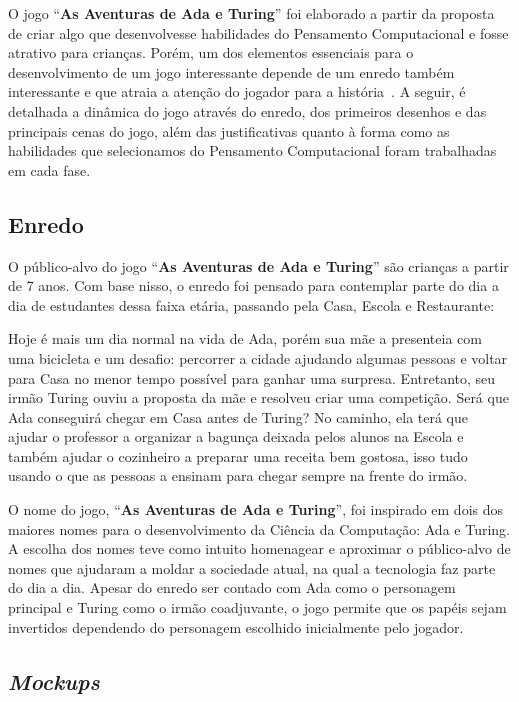 O jogo “\textbf{As Aventuras de Ada e Turing}” foi elaborado a partir da proposta de criar algo que desenvolvesse habilidades do Pensamento Computacional e fosse atrativo para crianças. Porém, um dos elementos essenciais para o desenvolvimento de um jogo interessante depende de um enredo também interessante e que atraia a atenção do jogador para a história~\cite{arruda2014fundamentos}. A seguir, é detalhada a dinâmica do jogo através do enredo, dos primeiros desenhos e das principais cenas do jogo, além das justificativas quanto à forma como as habilidades que selecionamos do Pensamento Computacional foram trabalhadas em cada fase.

\subsection{Enredo} \label{ssec:enredo}

O público-alvo do jogo “\textbf{As Aventuras de Ada e Turing}” são crianças a partir de 7 anos. Com base nisso, o enredo foi pensado para contemplar parte do dia a dia de estudantes dessa faixa etária, passando pela Casa, Escola e Restaurante:

Hoje é mais um dia normal na vida de Ada, porém sua mãe a presenteia com uma bicicleta e um desafio: percorrer a cidade ajudando algumas pessoas e voltar para Casa no menor tempo possível para ganhar uma surpresa. Entretanto, seu irmão Turing ouviu a proposta da mãe e resolveu criar uma competição. Será que Ada conseguirá chegar em Casa antes de Turing? No caminho, ela terá que ajudar o professor a organizar a bagunça deixada pelos alunos na Escola e também ajudar o cozinheiro a preparar uma receita bem gostosa, isso tudo usando o que as pessoas a ensinam para chegar sempre na frente do irmão.

O nome do jogo, “\textbf{As Aventuras de Ada e Turing}”, foi inspirado em dois dos maiores nomes para o desenvolvimento da Ciência da Computação: Ada e Turing. A escolha dos nomes teve como intuito homenagear e aproximar o público-alvo de nomes que ajudaram a moldar a sociedade atual, na qual a tecnologia faz parte do dia a dia. Apesar do enredo ser contado com Ada como o personagem principal e Turing como o irmão coadjuvante, o jogo permite que os papéis sejam invertidos dependendo do personagem escolhido inicialmente pelo jogador.

\subsection{\textit{Mockups}} \label{ssec:mockups}

